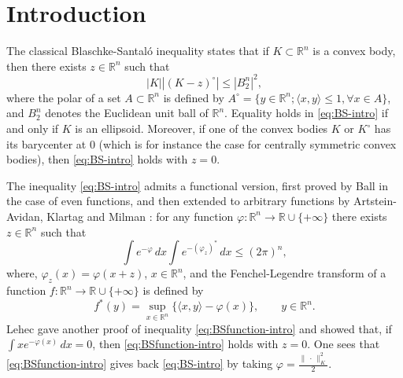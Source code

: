 \documentclass[10pt]{amsart}
\theoremstyle{definition}
\theoremstyle{remark}
\newcommand{\R}{\mathbb{R}}
\begin{document}
\tableofcontents

\section{Introduction}
The classical Blaschke-Santal\'o inequality \cite{blaschke_book,san49} states that if $K \subset \R^n$ is a convex body, then there exists $z\in\R^n$ such that
\begin{equation}\label{eq:BS-intro}
|K||(K-z)^\circ|\le |B_2^n|^2,
\end{equation}
where the polar of a set $A \subset \R^n$ is defined by $A^\circ = \{y\in\R^n; \langle x, y\rangle\le 1, \forall x\in A\}$, and $B_2^n$ denotes the Euclidean unit ball of $\R^n.$ Equality holds in \eqref{eq:BS-intro} if and only if $K$ is an ellipsoid. Moreover, if one of the convex bodies $K$ or $K^\circ$ has its barycenter at $0$ (which is for instance the case for centrally symmetric convex bodies), then \eqref{eq:BS-intro} holds with $z=0$.

The inequality \eqref{eq:BS-intro} admits a functional version, first proved by Ball \cite{ball86} in the case of even functions, and then extended to arbitrary functions by Artstein-Avidan, Klartag and Milman \cite{AAKM05}:  for any function $\varphi: \R^n\to\R\cup\{+\infty\}$ there exists $z\in\R^n$ such that 
\begin{equation}\label{eq:BSfunction-intro}
\int e^{-\varphi}\,dx\int e^{-(\varphi_z)^*}\,dx\le (2\pi)^n,
\end{equation}
where, $\varphi_z(x)=\varphi(x+z)$, $x\in \R^n$, and the Fenchel-Legendre transform of a function $f:\R^n\to \R\cup\{+\infty\}$ is defined by
\[
f^*(y)=\sup_{x\in \R^n} \{\langle x, y\rangle - \varphi(x)\},\qquad y\in \R^n.
\]
Lehec \cite{lehec3} gave another proof of inequality \eqref{eq:BSfunction-intro} and showed that, if $\int xe^{-\varphi(x)}\,dx=0$, then  \eqref{eq:BSfunction-intro} holds with $z=0$. One sees that \eqref{eq:BSfunction-intro} gives back \eqref{eq:BS-intro} by taking $\varphi = \frac{\|\,\cdot\,\|_K^2}{2}$.
\end{document}
